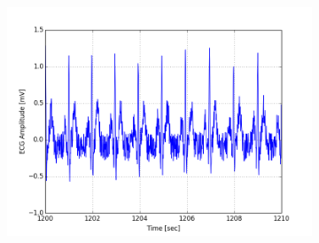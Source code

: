 \documentclass[paper=a4, fontsize=11pt]{scrartcl}
\numberwithin{equation}{section}		%
\numberwithin{figure}{section}			%
\numberwithin{table}{section}		    %
\begin{document}
\begin{appendices}
\begin{figure}[H]
\begin{subfigure}[b]{0.3\textwidth}
		\includegraphics[width=\textwidth]{sim/ecg_27}
	\end{subfigure}
\end{figure}


\end{appendices}
\end{document}
